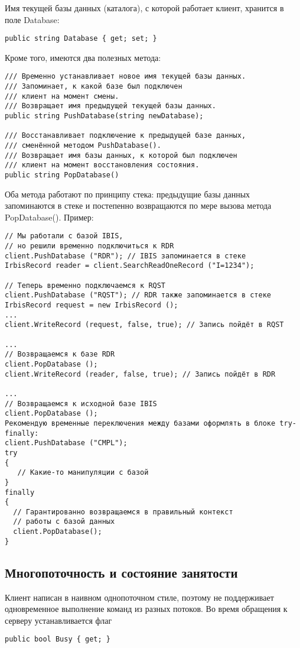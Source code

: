 Имя текущей базы данных (каталога), с которой работает клиент, хранится в поле Database:
\begin{lstlisting}
public string Database { get; set; }
\end{lstlisting}
Кроме того, имеются два полезных метода:
\begin{lstlisting}
/// Временно устанавливает новое имя текущей базы данных.
/// Запоминает, к какой базе был подключен
/// клиент на момент смены.
/// Возвращает имя предыдущей текущей базы данных.
public string PushDatabase(string newDatabase);

/// Восстанавливает подключение к предыдущей базе данных,
/// сменённой методом PushDatabase().
/// Возвращает имя базы данных, к которой был подключен 
/// клиент на момент восстановления состояния.
public string PopDatabase()
\end{lstlisting}
Оба метода работают по принципу стека: предыдущие базы данных запоминаются в стеке и постепенно возвращаются по мере вызова метода PopDatabase(). Пример:
\begin{lstlisting}
// Мы работали с базой IBIS, 
// но решили временно подключиться к RDR
client.PushDatabase ("RDR"); // IBIS запоминается в стеке
IrbisRecord reader = client.SearchReadOneRecord ("I=1234");

// Теперь временно подключаемся к RQST
client.PushDatabase ("RQST"); // RDR также запоминается в стеке
IrbisRecord request = new IrbisRecord ();
...
client.WriteRecord (request, false, true); // Запись пойдёт в RQST

...
// Возвращаемся к базе RDR
client.PopDatabase ();
client.WriteRecord (reader, false, true); // Запись пойдёт в RDR

...
// Возвращаемся к исходной базе IBIS
client.PopDatabase ();
Рекомендую временные переключения между базами оформлять в блоке try-finally: 
client.PushDatabase ("CMPL");
try
{
   // Какие-то манипуляции с базой
}
finally
{
  // Гарантированно возвращаемся в правильный контекст
  // работы с базой данных
  client.PopDatabase();
}
\end{lstlisting}

\subsection{Многопоточность и состояние занятости}

Клиент написан в наивном однопоточном стиле, поэтому не поддерживает одновременное выполнение команд из разных потоков. Во время обращения к серверу устанавливается флаг
\begin{lstlisting}
public bool Busy { get; }
\end{lstlisting}
